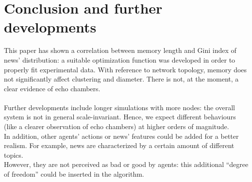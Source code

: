 \section{Conclusion and further developments}
This paper has shown a correlation between memory length and Gini index of news' distribution: 
a suitable optimization function was developed in order to properly fit experimental data.
With reference to network topology, memory does not significantly affect clustering and diameter.
There is not, at the moment, a clear evidence of echo chambers.\\
\\
Further developments include longer simulations with more nodes:  the overall system is not in general 
scale-invariant. Hence, we expect different behaviours (like a clearer observation of echo chambers) at higher orders of magnitude.\\
In addition, other agents' actions or news' features could be added for a better realism.
For example, news are characterized by a certain amount of different topics.\\
However, they are not perceived as bad or good by agents: this additional ``degree of freedom'' 
could be inserted in the algorithm.





